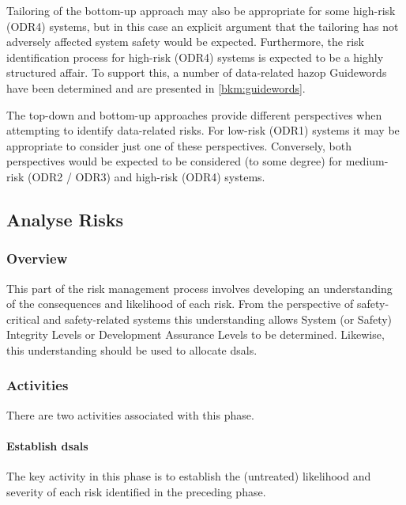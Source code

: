 Tailoring of the bottom-up approach may also be appropriate for some high-risk (ODR4) systems, but in this case an explicit argument that the tailoring has not adversely affected system safety would be expected. Furthermore, the risk identification process for high-risk (ODR4) systems is expected to be a highly structured affair. To support this, a number of data-related \gls{hazop} Guidewords have been determined
and are presented in \autoref{bkm:guidewords}.

The top-down and bottom-up approaches provide different perspectives when attempting to identify data-related risks. For low-risk (ODR1) systems it may be appropriate to consider just one of these perspectives. Conversely, both perspectives would be expected to be considered (to some degree) for medium-risk (ODR2 / ODR3) and high-risk (ODR4) systems.
%
\subsection{Analyse Risks}
\subsubsection{Overview}
This part of the risk management process involves developing an understanding of the consequences and likelihood of each risk. From the perspective of safety-critical and safety-related systems this understanding allows System (or Safety) Integrity Levels or Development Assurance Levels to be determined. Likewise, this understanding should be used to allocate
\glspl{dsal}.
%
%
\subsubsection{Activities}
There are two activities associated with this phase.
%
\paragraph{Establish \glspl{dsal}}
\label{bkm:DSAL-table-section}
The key activity in this phase is to establish the (untreated) likelihood and severity of each risk identified in the preceding phase.

